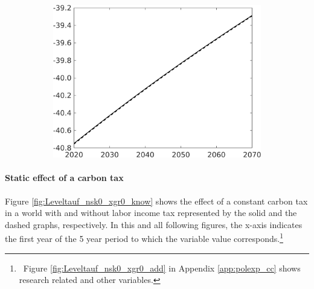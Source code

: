 \begin{figure}[h!!]
\begin{subfigure}[]{0.4\textwidth}
\includegraphics[width=1\textwidth]{../../codding_model/own_basedOnFried/optimalPol_010922_revision/figures/all_13Sept22/PerdifNoTauf_regime5_CompTaul_F_spillover0_nsk0_xgr0_knspil0_sep0_LFlimit0_emsbase0_countec0_GovRev0_etaa0.79_lgd0.png}
\end{subfigure}
\end{figure} 

\paragraph{Static effect of a carbon tax}
 Figure \ref{fig:Leveltauf_nsk0_xgr0_know} shows the effect of a constant carbon tax in a world with and without labor income tax represented by the solid and the dashed graphs, respectively. In this and all following figures, the x-axis indicates the first year of the 5 year period to which the variable value corresponds.\footnote{\ Figure \ref{fig:Leveltauf_nsk0_xgr0_add} in Appendix \ref{app:polexp_cc} shows research related and other variables.}  
 

